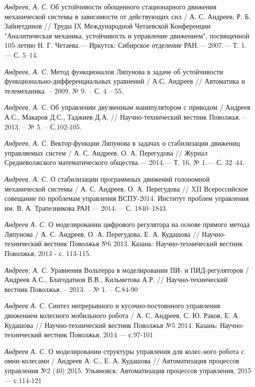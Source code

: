 \begin{thebibliography}{10}
	{\it Андреев, А. С.} Об устойчивости обощенного стационарного движения механической системы в зависимости от действующих сил /
	А. С. Андреев, Р. Б. Зайнетдинов // Труды IX Международной Четаевской Конференции "Аналитическая механика, устойчивость и управление движением", посвященной 105-летию Н. Г. Четаева.— Иркутск: Сибирское отделение РАН.— 2007.— Т. 1.— С. 5–14.
	
	{\it Андреев, А. С.} Метод функционалов Ляпунова в задаче об устойчивости функционально-дифференциальных уравнений / А.С. Андреев // Автоматика и телемеханика. – 2009, № 9. – С. 4 – 55.
	
	{\it Андреев, А. С.} Об управлении двузвенным манипулятором с приводом / Андреев А.С., Макаров Д.С., Таджиев Д.А. // Научно-технический вестник Поволжья. – 2013. – № 5. – С.102-105.
	
	{\it Андреев, А. С.} Вектор-функции Ляпунова в задачах о стабилизации движениц управляемых систем /
	А. С. Андреев, О. А. Перегудова // Журнал Средневолжского математического общества.— 2014.— Т. 16, № 1.—
	С. 32–44.
	
	{\it Андреев, А. С.} О стабилизации программных движений голономной механической системы /
	А. С. Андреев, О. А. Перегудова // XII Всероссийское совещание по проблемам управления ВСПУ-2014. Институт проблем управления им. В. А. Трапезникова РАН.— 2014.— С. 1840–1843.
	
	{\it Андреев А. С.} О моделировании цифрового регулятора на основе прямого метода Ляпунова / А. С. Андреев, О. А. Перегудова, Е. А. Кудашова //
	Научно-технический вестник Поволжья №6 2013. Казань: Научно-технический вестник Поволжья, 2013 - с. 113-115.
	
	{\it Андреев, А. С.} Уравнения Вольтерра в моделировании ПИ- и ПИД-регуляторов / Андреев А.С., Благодатнов В.В., Кильметова А.Р. // Научно-технический вестник Поволжья. – 2013. – № 1. – С.84-90
	
	{\it Андреев А. С.} Синтез непрерывного и кусочно-постоянного управления движением колесного мобильного робота / А. С. Андреев, С. Ю. Раков, Е. А. Кудашова  //
	Научно-технический вестник Поволжья №5 2014. Казань: Научно-технический вестник Поволжья, 2014 — с.97-101

	{\it Андреев А. С.} О моделировании структуры управления для колес-ного робота с омни-колесами / Андреев А. С., Е. А. Кудашова // Автоматизация процессов управления №2 (40) 2015. Ульяновск: Автоматизация процессов управления, 2015 — с.114-121
	

\end{thebibliography}
